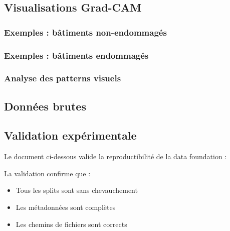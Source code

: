 



\subsection{Visualisations Grad-CAM}

\subsubsection{Exemples : bâtiments non-endommagés}


\subsubsection{Exemples : bâtiments endommagés}


\subsubsection{Analyse des patterns visuels}




\subsection{Données brutes}
\newpage




\subsection{Validation expérimentale}

Le document ci-dessous valide la reproductibilité de la data foundation :



La validation confirme que :
\begin{itemize}
    \item Tous les splits sont sans chevauchement
    \item Les métadonnées sont complètes
    \item Les chemins de fichiers sont corrects
\end{itemize}


